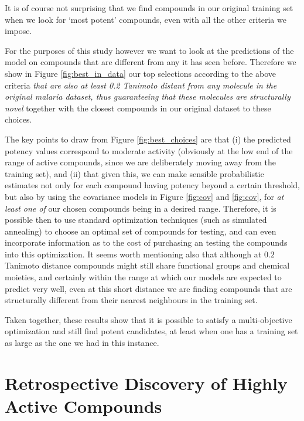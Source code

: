 \documentclass[journal=jacsat,manuscript=article]{achemso}
\begin{document}
It is of course not surprising that we find compounds in our original training set when we look for `most potent' compounds, even with all the other criteria we impose.  

\newline
\newline
For the purposes of this study however we want to look at the predictions of the model on compounds that are different from any it has seen before.  Therefore we show in Figure \ref{fig:best_in_data} our top selections according to the above criteria \textit{that are also at least 0.2 Tanimoto distant from any molecule in the original malaria dataset, thus guaranteeing that these molecules are structurally novel} together with the closest compounds in our original dataset to these choices.


The key points to draw from Figure \ref{fig:best_choices} are that (i) the predicted potency values correspond to moderate activity (obviously at the low end of the range of active compounds, since we are deliberately moving away from the training set), and (ii) that given this, we can make sensible probabilistic estimates not only for each compound having potency beyond a certain threshold, but also by using the covariance models in Figure \ref{fig:cov} and \ref{fig:cov}, for \textit{at least one of} our chosen compounds being in a desired range.   
Therefore, it is possible then to use standard optimization techniques (such as simulated annealing) to choose an optimal set of compounds for testing, and can even incorporate information as to the cost of purchasing an testing the compounds into this optimization. It seems worth mentioning also that although at $0.2$ Tanimoto distance compounds might still share functional groups and chemical moieties, and certainly within the range at which our models are expected to predict very well, even at this short distance we are finding compounds that are structurally different from their nearest neighbours in the training set.  

Taken together,  these results show that it is possible to satisfy a multi-objective optimization and still find  potent candidates, at least when one has a training set as large as the one we had in this instance.

\section*{Retrospective Discovery of Highly Active Compounds}
\end{document}
